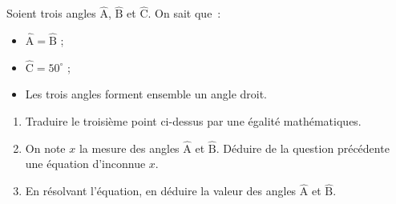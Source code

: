 \documentclass[exercice]{thedocument}%
\begin{document}
%
Soient trois angles $\widehat{\text{A}}$, $\widehat{\text{B}}$ et $\widehat{\text{C}}$.
On sait que~:
\begin{itemize}
    \item $\widehat{\text{A}}=\widehat{\text{B}}$ ;
    \item $\widehat{\text{C}}=50^\circ$ ;
    \item Les trois angles forment ensemble un angle droit.
\end{itemize}
\begin{enumerate}
    \item Traduire le troisième point ci-dessus par une égalité mathématiques.
    \item On note $x$ la mesure des angles $\widehat{\text{A}}$ et  $\widehat{\text{B}}$.
    Déduire de la question précédente une équation d'inconnue $x$.
    \item En résolvant l'équation, en déduire la valeur des angles $\widehat{\text{A}}$ et $\widehat{\text{B}}$.
\end{enumerate}
\end{document}
